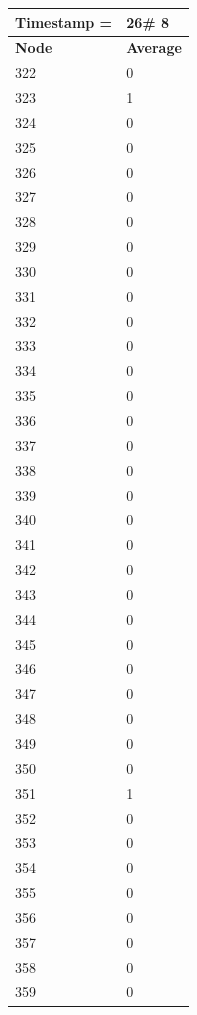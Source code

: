 \begin{tabular}{|l||l|}
\hline
\textbf{Timestamp =} & \textbf{26}\# 8\\\hline
	\textbf{Node} & \textbf{Average} \\ \hline
\hline
	322 & 0 \\ \hline
	323 & 1 \\ \hline
	324 & 0 \\ \hline
	325 & 0 \\ \hline
	326 & 0 \\ \hline
	327 & 0 \\ \hline
	328 & 0 \\ \hline
	329 & 0 \\ \hline
	330 & 0 \\ \hline
	331 & 0 \\ \hline
	332 & 0 \\ \hline
	333 & 0 \\ \hline
	334 & 0 \\ \hline
	335 & 0 \\ \hline
	336 & 0 \\ \hline
	337 & 0 \\ \hline
	338 & 0 \\ \hline
	339 & 0 \\ \hline
	340 & 0 \\ \hline
	341 & 0 \\ \hline
	342 & 0 \\ \hline
	343 & 0 \\ \hline
	344 & 0 \\ \hline
	345 & 0 \\ \hline
	346 & 0 \\ \hline
	347 & 0 \\ \hline
	348 & 0 \\ \hline
	349 & 0 \\ \hline
	350 & 0 \\ \hline
	351 & 1 \\ \hline
	352 & 0 \\ \hline
	353 & 0 \\ \hline
	354 & 0 \\ \hline
	355 & 0 \\ \hline
	356 & 0 \\ \hline
	357 & 0 \\ \hline
	358 & 0 \\ \hline
	359 & 0 \\ \hline
\end{tabular}

